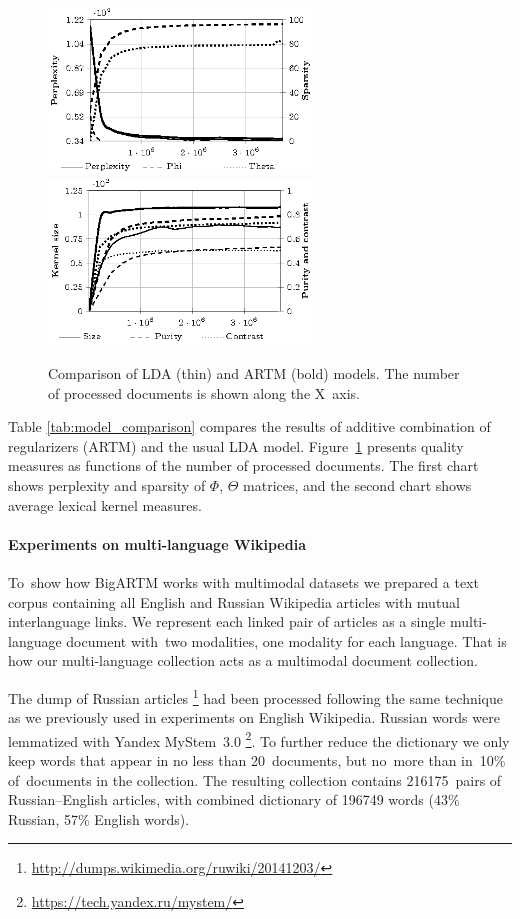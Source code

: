 \documentclass{sig-alternate}
\begin{document}
\begin{figure}[t]
    \centering
    \includegraphics[width=70mm]{plot_perplexity_sparsity.eps}\\
    \includegraphics[width=70mm]{plot_kernel.eps}
\caption{Comparison of LDA (thin) and ARTM (bold) models. The number of processed documents is shown along the X~axis.}
\label{fig:comparison_plot}
\end{figure}

Table \ref{tab:model_comparison} compares the results of additive combination of regularizers (ARTM) and the usual LDA model.
Figure~\ref{fig:comparison_plot} presents quality measures as functions of the number of processed documents.
The first chart shows perplexity and sparsity of $\Phi$, $\Theta$ matrices, and
the second chart shows average lexical kernel measures.


\paragraph{Experiments on multi-language Wikipedia}

To~show how BigARTM works with multimodal datasets we prepared a text corpus
containing all English and Russian Wikipedia articles with mutual interlanguage links.
We represent each linked pair of articles
as a single multi-language document with~two modalities, one modality for each language.
That is how our multi-language collection acts as a multimodal document collection.

The dump of Russian articles%
\footnote{\url{http://dumps.wikimedia.org/ruwiki/20141203/}}
had been processed following the same technique as we previously used in experiments on English Wikipedia.
Russian words were lemmatized with Yandex MyStem~3.0%
\footnote{\url{https://tech.yandex.ru/mystem/}}.
To further reduce the dictionary we only keep words
that appear in no less than 20~documents, but no~more than in~10\% of~documents in the collection.
The resulting collection contains 216175~pairs of Russian--English articles, with combined dictionary
of 196749 words (43\% Russian, 57\% English words).
\end{document}
